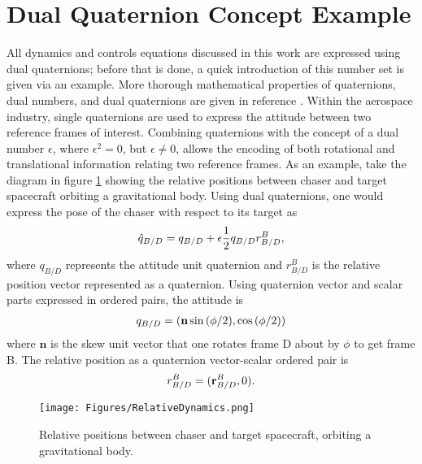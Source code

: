 \documentclass[letterpaper, preprint, paper,11pt]{AAS}	%
\begin{document}
\section{Dual Quaternion Concept Example}
All dynamics and controls equations discussed in this work are expressed using dual quaternions; before that is done, a quick introduction of this number set is given via an example. More thorough mathematical properties of quaternions, dual numbers, and dual quaternions are given in reference . Within the aerospace industry, single quaternions are used to express the attitude between two reference frames of interest. Combining quaternions with the concept of a dual number $\epsilon$, where $\epsilon^2 = 0$, but $\epsilon \ne 0$, allows the encoding of both rotational and translational information relating two reference frames. As an example, take the diagram in figure \ref{fig:Rel_Pos} showing the relative positions between chaser and target spacecraft orbiting a gravitational body. Using dual quaternions, one would express the pose of the chaser with respect to its target as
\begin{equation}
\begin{aligned}
\label{eq:dual_quat_eg}
\hat{q}_{B/D} = q_{B/D} + \epsilon \frac{1}{2} q_{B/D} r^B_{B/D},
\end{aligned}\\
\end{equation}
where $q_{B/D}$ represents the attitude unit quaternion and $r^B_{B/D}$ is the relative position vector represented as a quaternion. Using quaternion vector and scalar parts expressed in ordered pairs, the attitude is
\begin{equation}
\begin{aligned}
\label{eq:att_quat}
q_{B/D} = (\textbf{n}\sin{(\phi/2)} , \cos{(\phi/2)}) 
\end{aligned}\\
\end{equation}
where $\textbf{n}$ is the skew unit vector that one rotates frame D about by $\phi$ to get frame B. The relative position as a quaternion vector-scalar ordered pair is 
\begin{equation}
\begin{aligned}
\label{eq:pos_quat}
r_{B/D}^B = (\textbf{r}_{B/D}^B, 0).
\end{aligned}\\
\end{equation}


\begin{figure}[htb]
	\centering\texttt{[image: Figures/RelativeDynamics.png]}
	\caption{Relative positions between chaser and target spacecraft, orbiting a gravitational body.}
	\label{fig:Rel_Pos}
\end{figure}
\end{document}
